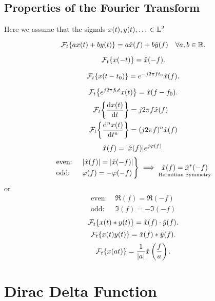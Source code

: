\documentclass{report}
\newcommand{\Ft}[1]{\SF_t\!\lt\{ #1 \rt\}}
\begin{document}
\subsection{Properties of the Fourier Transform}

Here we assume that the signals $x(t),y(t),\dots\,\in\mathbb{L}^2$

\begin{description}
	\ii[Linearity]
	\[
		\Ft{ax(t) + by(t)} = a\hat{x}(f) + b\hat{y}(f) \quad \forall a,b \in \RR
		.\]

	\ii[Inverse]
	\[
		\Ft{x(-t)} = \hat{x}(-f)
		.\]

	\[
		\Ft{x(t-t_0)} = e^{-j2\pi ft_0}\hat{x}(f)
		.\]

	\ii[Modulation]
	\[
		\Ft{e^{j2\pi f_0t}x(t)} = \hat{x}(f-f_0)
		.\]
	\ii[Differentiation]
	\begin{align*}
		\Ft{\dv{x(t)}{t}}    & = j2\pi f\hat{x}(f)     \\
		\Ft{\dv[n]{x(t)}{t}} & = (j2\pi f)^n\hat{x}(f)
	\end{align*}
	\ii[Symmetry]
	\[
		\hat{x}(f) = \abs{\hat{x}(f)} e^{j \varphi(f)}
		.\]
	\[
		\begin{rcases}
			\text{even: } & \abs{\hat{x}(f)} = \abs{\hat{x}(-f)} \\
			\text{odd: }  & \varphi(f) = -\varphi(-f)
		\end{rcases} \implies \underset{\text{Hermitian Symmetry}}{\hat{x}(f) = \hat{x}^*(-f)}
	\]
	or
	\begin{align*}
		\text{even: } & \Re(f) = \Re(-f)  \\
		\text{odd: }  & \Im(f) = -\Im(-f)
	\end{align*}
	\ii[Convolution]
	\[
		\Ft{x(t) * y(t)} = \hat{x}(f)\cdot\hat{y}(f)
		.\]
	\ii[Product]
	\[
		\Ft{x(t)y(t)} = \hat{x}(f) * \hat{y}(f)
		.\]
	\ii[Scaling]
	\[
		\Ft{x(at)} = \frac{1}{\abs{a}}\hat{x}\lt(\frac{f}{a}\rt)
		.\]
\end{description}


\section{Dirac Delta Function}
\end{document}
